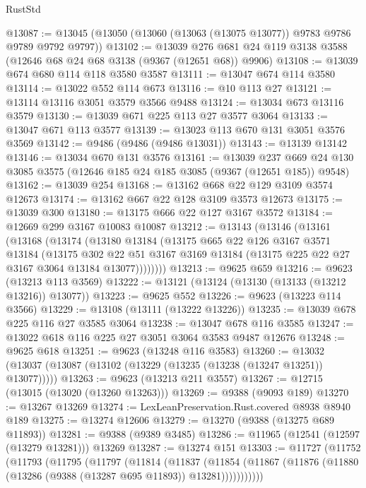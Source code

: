 \begin{lexlean}{RustStd}
\begin{coremodule}
@13087 := @13045 (@13050 (@13060 (@13063 (@13075 @13077)) @9783 @9786 @9789 @9792 @9797))
@13102 := @13039
    @276
    @681
    @24
    @119
    @3138
    @3588
    (@12646 @68 @24 @68 @3138 (@9367 (@12651 @68)) @9906)
@13108 := @13039 @674 @680 @114 @118 @3580 @3587
@13111 := @13047 @674 @114 @3580
@13114 := @13022 @552 @114 @673
@13116 := @10 @113 @27
@13121 := @13114 @13116 @3051 @3579 @3566 @9488
@13124 := @13034 @673 @13116 @3579
@13130 := @13039 @671 @225 @113 @27 @3577 @3064
@13133 := @13047 @671 @113 @3577
@13139 := @13023 @113 @670 @131 @3051 @3576 @3569
@13142 := @9486 (@9486 (@9486 @13031))
@13143 := @13139 @13142
@13146 := @13034 @670 @131 @3576
@13161 := @13039
    @237
    @669
    @24
    @130
    @3085
    @3575
    (@12646 @185 @24 @185 @3085 (@9367 (@12651 @185)) @9548)
@13162 := @13039 @254
@13168 := @13162 @668 @22 @129 @3109 @3574 @12673
@13174 := @13162 @667 @22 @128 @3109 @3573 @12673
@13175 := @13039 @300
@13180 := @13175 @666 @22 @127 @3167 @3572
@13184 := @12669 @299 @3167 @10083 @10087
@13212 := @13143
    (@13146
      (@13161
        (@13168
          (@13174
            (@13180
              @13184
              (@13175
                @665
                @22
                @126
                @3167
                @3571
                @13184
                (@13175
                  @302
                  @22
                  @51
                  @3167
                  @3169
                  @13184
                  (@13175 @225 @22 @27 @3167 @3064 @13184 @13077))))))))
@13213 := @9625 @659
@13216 := @9623 (@13213 @113 @3569)
@13222 := @13121 (@13124 (@13130 (@13133 (@13212 @13216)) @13077))
@13223 := @9625 @552
@13226 := @9623 (@13223 @114 @3566)
@13229 := @13108 (@13111 (@13222 @13226))
@13235 := @13039 @678 @225 @116 @27 @3585 @3064
@13238 := @13047 @678 @116 @3585
@13247 := @13022 @618 @116 @225 @27 @3051 @3064 @3583 @9487 @12676
@13248 := @9625 @618
@13251 := @9623 (@13248 @116 @3583)
@13260 := @13032 (@13037 (@13087 (@13102 (@13229 (@13235 (@13238 (@13247 @13251)) @13077)))))
@13263 := @9623 (@13213 @211 @3557)
@13267 := @12715 (@13015 (@13020 (@13260 @13263)))
@13269 := @9388 (@9093 @189)
@13270 := @13267 @13269
@13274 := LexLeanPreservation.Rust.covered @8938 @8940 @189
@13275 := @13274 @12606
@13279 := @13270 (@9388 (@13275 @689 @11893))
@13281 := @9388 (@9389 @3485)
@13286 := @11965 (@12541 (@12597 (@13279 @13281))) @13269
@13287 := @13274 @151
@13303 := @11727
    (@11752
      (@11793
        (@11795
          (@11797
            (@11814
              (@11837
                (@11854
                  (@11867 (@11876 (@11880 (@13286 (@9388 (@13287 @695 @11893)) @13281)))))))))))

\end{coremodule}
\end{lexlean}
